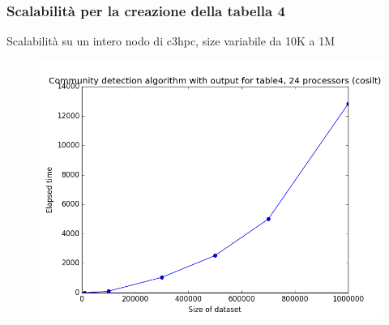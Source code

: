 \documentclass{beamer}
\begin{document}
\begin{frame}
 \frametitle{Scalabilità per la creazione della tabella 4}
Scalabilità su un intero nodo di c3hpc, size variabile da 10K a 1M
  \begin{figure}[htbp]
\centering
\includegraphics[height=6.0 cm,width=10 cm]{24cores_table4.png}

\end{figure}
\end{frame}
\end{document}
